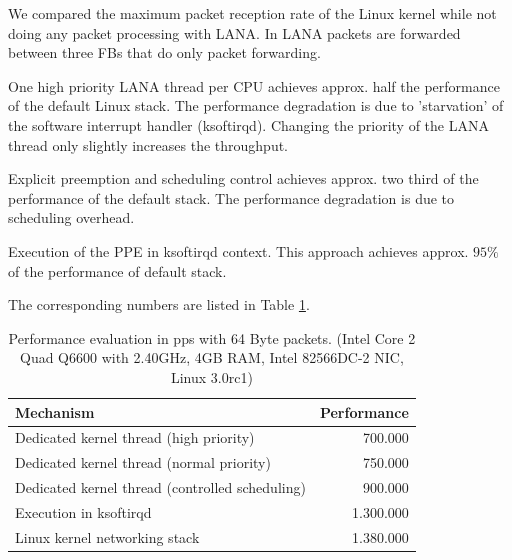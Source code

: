 \documentclass{sig-alternate}
\begin{document}
We compared the maximum packet reception rate of the Linux kernel while not doing any packet processing with LANA. In LANA packets are forwarded between three FBs that do only packet forwarding. 


\begin{compactitem}
\item One high priority LANA thread per CPU achieves approx. half the performance of the default Linux stack. The performance degradation is due to 'starvation' of the software interrupt handler (ksoftirqd). Changing the priority of the LANA thread only slightly increases the throughput.
\item Explicit preemption and scheduling control achieves approx. two third of the performance of the default stack. The performance degradation is due to scheduling overhead. 
\item Execution of the PPE in ksoftirqd context. This approach achieves
      approx. $95\%$ of the performance of default stack.
\end{compactitem}

The corresponding numbers are listed in Table \ref{tab:performance}.
\begin{table}[htb]
\begin{tabular}{ l r }
Mechanism & Performance\\
\hline
Dedicated kernel thread (high priority) & 700.000\\
Dedicated kernel thread (normal priority) & 750.000\\
Dedicated kernel thread (controlled scheduling) & 900.000\\
Execution in ksoftirqd & 1.300.000\\
Linux kernel networking stack & 1.380.000\\
\end{tabular}
\caption{Performance evaluation in pps with 64 Byte packets.
(Intel Core 2 Quad Q6600 with 2.40GHz, 4GB RAM, Intel 82566DC-2 NIC, Linux 3.0rc1)}
\label{tab:performance}
\vspace{-0.1cm}
\end{table}
\end{document}
